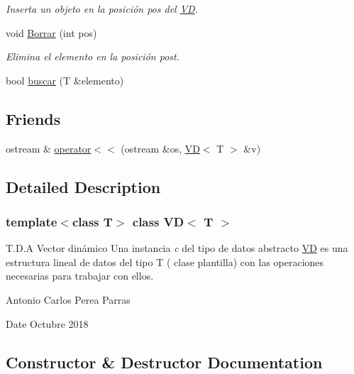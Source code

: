 \begin{DoxyCompactItemize}
\begin{DoxyCompactList}\small\item\em Inserta un objeto en la posición pos del \mbox{\hyperlink{class_v_d}{VD}}. \end{DoxyCompactList}\item 
void \mbox{\hyperlink{class_v_d_a13528c6fae34510d10699f426de88e27}{Borrar}} (int pos)
\begin{DoxyCompactList}\small\item\em Elimina el elemento en la posición post. \end{DoxyCompactList}\item 
bool \mbox{\hyperlink{class_v_d_a5e6df2f4f78a27d8ff3af5646c24bb9d}{buscar}} (T \&elemento)
\end{DoxyCompactItemize}
\subsection*{Friends}
\begin{DoxyCompactItemize}
\item 
ostream \& \mbox{\hyperlink{class_v_d_a734c0c269d63f56fbced245e3c36f518}{operator$<$$<$}} (ostream \&os, \mbox{\hyperlink{class_v_d}{VD}}$<$ T $>$ \&v)
\end{DoxyCompactItemize}


\subsection{Detailed Description}
\subsubsection*{template$<$class T$>$\newline
class V\+D$<$ T $>$}

T.\+D.\+A Vector dinámico Una instancia {\itshape c} del tipo de datos abstracto {\ttfamily \mbox{\hyperlink{class_v_d}{VD}}} es una estructura lineal de datos del tipo T ( clase plantilla) con las operaciones necesarias para trabajar con ellos. 

Antonio Carlos Perea Parras \begin{DoxyDate}{Date}
Octubre 2018 
\end{DoxyDate}


\subsection{Constructor \& Destructor Documentation}
\mbox{\label{class_v_d_a1ce73549d14f68caecaa593de3255c30}} 

